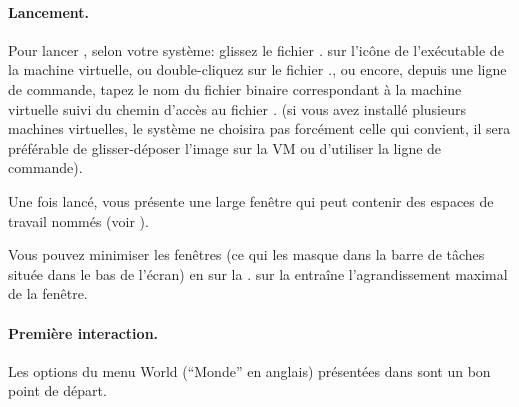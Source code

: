 \documentclass[a4paper,10pt,twoside]{book}
\begin{document}

\paragraph{Lancement.} Pour lancer \pharo, selon votre système: glissez
le fichier \emph{.} sur l'icône de l'exécutable de la
machine virtuelle, ou double-cliquez sur le fichier
\emph{.}, ou encore, depuis une ligne de commande,
tapez le nom du fichier binaire correspondant à la machine virtuelle
suivi du chemin d'accès au fichier \emph{.} (si vous
avez installé plusieurs machines virtuelles, le système ne choisira
pas forcément celle qui convient, il sera préférable de
glisser-déposer l'image sur la VM ou d'utiliser la ligne de commande).

Une fois lancé, \pharo vous présente une large fenêtre qui peut contenir des
espaces de travail nommés  (voir ).


Vous pouvez minimiser les fenêtres (ce qui les masque dans la
barre de tâches située dans le bas de l'écran) en \clickant{} sur la
. \Click{} sur la 
entraîne l'agrandissement maximal de la fenêtre.

\paragraph{Première interaction.}

Les options du menu World (``Monde'' en anglais) présentées dans
 sont un bon point de départ.

\end{document}
